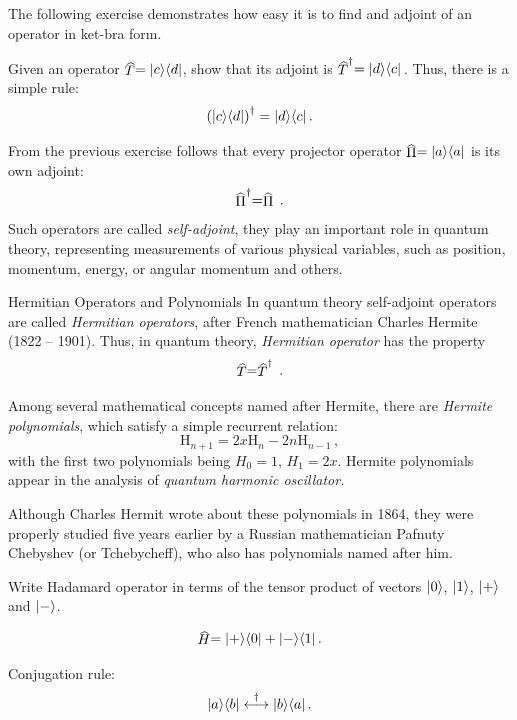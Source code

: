 The following exercise demonstrates how easy it is to find and adjoint of an operator in ket-bra form.
\begin{exercise}
	Given an operator $\op{T}=\ketbra{c}{d}$, show that its adjoint is $\op{T}^\dagger=\ketbra{d}{c}$\,.
	Thus, there is a simple rule:
	\[
	\left(|{c}\rangle\langle{d}|\right)^\dagger = |{d}\rangle\langle{c}|\,.
	\]
\end{exercise}
From the previous exercise follows that every projector operator $\op{\Pi}=\ketbra{a}{a}$ is its own adjoint:
\[
\op{\Pi}^\dagger=\op{\Pi}\,.
\]
Such operators are called \emph{self-adjoint}, they play an important role in quantum theory, representing measurements of various physical variables, such as position, momentum, energy, or angular momentum and others.
\begin{mybio}{Hermitian Operators and Polynomials}
	In quantum theory self-adjoint operators are called \emph{Hermitian operators}, after French mathematician Charles Hermite (1822 – 1901). Thus, in quantum theory, \emph{Hermitian operator} has the property
	\[
	\op{T}=\op{T}^\dagger\,.
	\]
	
	
	Among several mathematical concepts named after Hermite, there are \emph{Hermite polynomials}, which satisfy a simple recurrent relation:
	\[
	\textrm{H}_{n+1}=2x\textrm{H}_{n}-2n\textrm{H}_{n-1}\,,
	\]
	with the first two polynomials being $H_0=1$, $H_1=2x$. Hermite polynomials appear in the analysis of \emph{quantum harmonic oscillator.}
	
	Although Charles Hermit wrote about these polynomials in 1864, they were properly studied five years earlier by a Russian mathematician Pafnuty Chebyshev (or Tchebycheff), who also has polynomials named after him.
	
	
\end{mybio}


\begin{exercise}
	Write Hadamard operator in terms of the tensor product of vectors $|{0}\rangle$, $|{1}\rangle$, $|{+}\rangle$ and $|{-}\rangle$.
	
	\[
	\op{H} = \ketbra{+}{0}+\ketbra{-}{1}\,.
	\]
\end{exercise}

\begin{remark}
	Conjugation rule:
	\[
	|{a}\rangle\langle{b}|\overset{\dagger}{\longleftrightarrow}|{b}\rangle\langle{a}|\,.
	\]
\end{remark}

